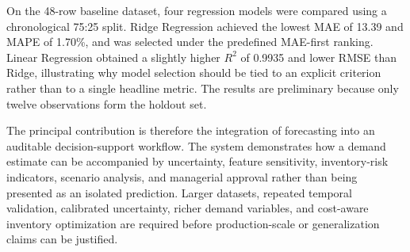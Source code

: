 \documentclass[9pt,conference]{IEEEtran}
\providecommand{\syscite}[1]{}
\begin{document}
On the 48-row baseline dataset, four regression models were compared using a chronological 75:25 split. \syscite{[cite: 1]} Ridge Regression achieved the lowest MAE of 13.39 and MAPE of 1.70\%, and was selected under the predefined MAE-first ranking. \syscite{[cite: 1]} Linear Regression obtained a slightly higher $R^{2}$ of 0.9935 and lower RMSE than Ridge, illustrating why model selection should be tied to an explicit criterion rather than to a single headline metric. \syscite{[cite: 1]} The results are preliminary because only twelve observations form the holdout set. \syscite{[cite: 1]}

The principal contribution is therefore the integration of forecasting into an auditable decision-support workflow. \syscite{[cite: 1]} The system demonstrates how a demand estimate can be accompanied by uncertainty, feature sensitivity, inventory-risk indicators, scenario analysis, and managerial approval rather than being presented as an isolated prediction. \syscite{[cite: 1]} Larger datasets, repeated temporal validation, calibrated uncertainty, richer demand variables, and cost-aware inventory optimization are required before production-scale or generalization claims can be justified. \syscite{[cite: 1]}
\end{document}
